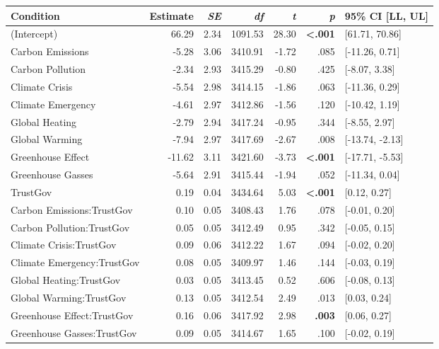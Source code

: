 \begin{table}[ht]
\centering
\begin{tabular}{lrrrrrl}
  \hline
Condition & Estimate & \textit{SE} & \textit{df} & \textit{t} & \textit{p} & 95\% CI [LL, UL] \\ 
  \hline
(Intercept) & 66.29 & 2.34 & 1091.53 & 28.30 & \textbf{\textless  .001} & [61.71, 70.86] \\ 
  Carbon Emissions & -5.28 & 3.06 & 3410.91 & -1.72 & .085 & [-11.26, 0.71] \\ 
  Carbon Pollution & -2.34 & 2.93 & 3415.29 & -0.80 & .425 & [-8.07, 3.38] \\ 
  Climate Crisis & -5.54 & 2.98 & 3414.15 & -1.86 & .063 & [-11.36, 0.29] \\ 
  Climate Emergency & -4.61 & 2.97 & 3412.86 & -1.56 & .120 & [-10.42, 1.19] \\ 
  Global Heating & -2.79 & 2.94 & 3417.24 & -0.95 & .344 & [-8.55, 2.97] \\ 
  Global Warming & -7.94 & 2.97 & 3417.69 & -2.67 & .008 & [-13.74, -2.13] \\ 
  Greenhouse Effect & -11.62 & 3.11 & 3421.60 & -3.73 & \textbf{\textless  .001} & [-17.71, -5.53] \\ 
  Greenhouse Gasses & -5.64 & 2.91 & 3415.44 & -1.94 & .052 & [-11.34, 0.04] \\ 
  TrustGov & 0.19 & 0.04 & 3434.64 & 5.03 & \textbf{\textless  .001} & [0.12, 0.27] \\ 
  Carbon Emissions:TrustGov & 0.10 & 0.05 & 3408.43 & 1.76 & .078 & [-0.01, 0.20] \\ 
  Carbon Pollution:TrustGov & 0.05 & 0.05 & 3412.49 & 0.95 & .342 & [-0.05, 0.15] \\ 
  Climate Crisis:TrustGov & 0.09 & 0.06 & 3412.22 & 1.67 & .094 & [-0.02, 0.20] \\ 
  Climate Emergency:TrustGov & 0.08 & 0.05 & 3409.97 & 1.46 & .144 & [-0.03, 0.19] \\ 
  Global Heating:TrustGov & 0.03 & 0.05 & 3413.45 & 0.52 & .606 & [-0.08, 0.13] \\ 
  Global Warming:TrustGov & 0.13 & 0.05 & 3412.54 & 2.49 & .013 & [0.03, 0.24] \\ 
  Greenhouse Effect:TrustGov & 0.16 & 0.06 & 3417.92 & 2.98 & \textbf{.003} & [0.06, 0.27] \\ 
  Greenhouse Gasses:TrustGov & 0.09 & 0.05 & 3414.67 & 1.65 & .100 & [-0.02, 0.19] \\ 
   \hline
\end{tabular}
\end{table}
